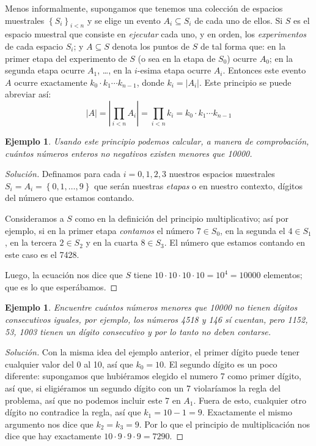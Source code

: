 \documentclass[spanish]{report}
\newtheorem{ejm}[thm]{Ejemplo}
\newcommand{\card}[1]{\left|#1 \right|}
\begin{document}
Menos informalmente, supongamos que tenemos una colección de espacios muestrales $\left\lbrace S_i \right\rbrace_{i<n}$ y se elige un evento $A_i \subseteq S_i$ de cada uno de ellos. 
Si $S$ es el espacio muestral que consiste en \emph{ejecutar} %
cada uno, y en orden, los \emph{experimentos} de cada espacio $S_i$; y $A \subseteq S$ denota los puntos de $S$ de tal forma que: en la primer etapa del experimento de $S$ (o sea en la etapa de $S_0$) ocurre $A_0$; en la segunda etapa ocurre $A_1$, \ldots, en la $i$-esima etapa ocurre $A_i$. Entonces este evento $A$ ocurre exactamente $k_0 \cdotp k_1 \cdots k_{n-1}$, donde $k_i= \card{A_i}$.
Este principio se puede abreviar así:
\begin{equation}\label{eq_PrincipioMultiplicativo}
	\card{A} = \card{\prod_{i<n} A_i} = \prod_{i<n}k_i = k_0 \cdotp k_1 \cdots k_{n-1}
\end{equation}

\begin{ejm}\label{ejm_numerosMenorQue}
	Usando este principio podemos calcular, a manera de comprobación, cuántos números enteros no negativos existen menores que 10000.
\end{ejm}
\begin{proof}[Solución]
Definamos para cada $i=0,1,2,3$ nuestros espacios muestrales $S_i = A_i= \left\lbrace 0,1, \ldots,9 \right\rbrace$ que serán nuestras \emph{etapas} o en nuestro contexto, dígitos del número que estamos contando. %

Consideramos a $S$ como en la definición del principio multiplicativo; así por ejemplo, si en la primer etapa \emph{contamos} el número $7 \in S_0$, en la segunda el $4 \in S_1$, en la tercera $2 \in S_2$ y en la cuarta $8 \in S_3$. El número que estamos contando en este caso es el 7428.

Luego, la ecuación nos dice que $S$ tiene $10 \cdotp 10\cdotp 10 \cdotp 10 = 10^4 = 10000$ elementos; que es lo que esperábamos.
\end{proof}
\begin{ejm}
	Encuentre cuántos números menores que 10000 no tienen dígitos consecutivos iguales, por ejemplo, los números 4518 y 146 sí cuentan, pero 1152, 53, 1003 tienen un dígito consecutivo y por lo tanto no deben contarse.
\end{ejm}
\begin{proof}[Solución]
	Con la misma idea del ejemplo anterior, el primer dígito puede tener cualquier valor del 0 al 10, así que $k_0 = 10$. El segundo dígito es un poco diferente: supongamos que hubiéramos elegido el numero 7 como primer dígito, así que, si eligiéramos un segundo dígito con un 7 violaríamos la regla del problema, así que no podemos incluir este 7 en $A_1$. Fuera de esto, cualquier otro dígito no contradice la regla, así que $k_1 = 10 - 1 = 9$. 
Exactamente el mismo argumento nos dice que $k_2 = k_3 = 9$.
Por lo que el principio de multiplicación nos dice que hay exactamente $10 \cdotp 9 \cdotp 9 \cdotp 9 = 7290$.
\end{proof}
\end{document}
